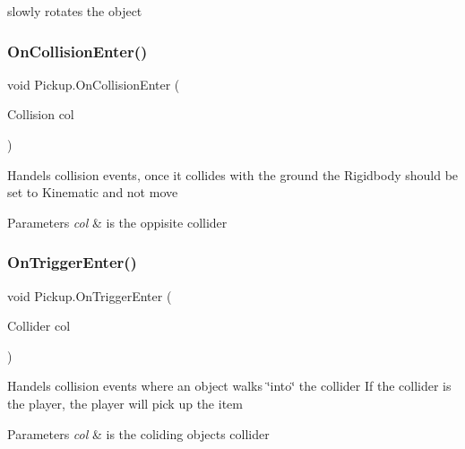 slowly rotates the object \mbox{\label{class_pickup_af91a544b99c9d52864ec6a074df98d73}} 
\subsubsection{\texorpdfstring{On\+Collision\+Enter()}{OnCollisionEnter()}}
{\footnotesize\ttfamily void Pickup.\+On\+Collision\+Enter (\begin{DoxyParamCaption}\item[{Collision}]{col }\end{DoxyParamCaption})\hspace{0.3cm}{\ttfamily [private]}}

Handels collision events, once it collides with the ground the Rigidbody should be set to Kinematic and not move 
\begin{DoxyParams}{Parameters}
{\em col} & is the oppisite collider \\
\hline
\end{DoxyParams}
\mbox{\label{class_pickup_a5f190e230de9ed4839c26642785896be}} 
\subsubsection{\texorpdfstring{On\+Trigger\+Enter()}{OnTriggerEnter()}}
{\footnotesize\ttfamily void Pickup.\+On\+Trigger\+Enter (\begin{DoxyParamCaption}\item[{Collider}]{col }\end{DoxyParamCaption})\hspace{0.3cm}{\ttfamily [private]}}

Handels collision events where an object walks \char`\"{}into\char`\"{} the collider If the collider is the player, the player will pick up the item 
\begin{DoxyParams}{Parameters}
{\em col} & is the coliding object\textquotesingle{}s collider \\
\hline
\end{DoxyParams}
\mbox{\label{class_pickup_aa0f4313f4bb636d95ec9ba901f4dc932}} 
